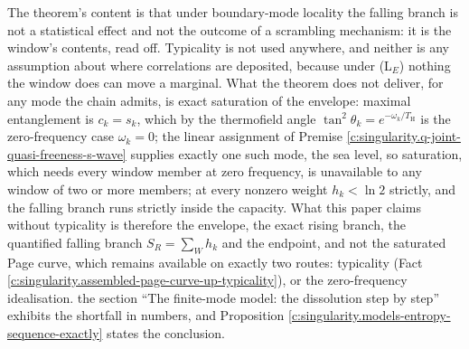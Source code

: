\documentclass[11pt]{article}
\theoremstyle{definition}
\theoremstyle{plain}
\providecommand{\TH}{}\renewcommand{\TH}{T_{\mathrm{H}}}
\begin{document}
\label{c:note.singularity.setting-eviction-theorem-falling-branch-without-3}
The theorem's content is that under boundary-mode locality the falling branch is not a statistical effect and not the outcome of a scrambling mechanism: it is the window's contents, read off. Typicality is not used anywhere, and neither is any assumption about where correlations are deposited, because under (L$_E$) nothing the window does can move a marginal. What the theorem does not deliver, for any mode the chain admits, is exact saturation of the envelope: maximal entanglement is $c_k = s_k$, which by the thermofield angle $\tan^{2}\theta_k = e^{-\omega_k/\TH}$ is the zero-frequency case $\omega_k = 0$; the linear assignment of Premise \ref{c:singularity.q-joint-quasi-freeness-s-wave} supplies exactly one such mode, the sea level, so saturation, which needs every window member at zero frequency, is unavailable to any window of two or more members; at every nonzero weight $h_k < \ln 2$ strictly, and the falling branch runs strictly inside the capacity. What this paper claims without typicality is therefore the envelope, the exact rising branch, the quantified falling branch $S_R = \sum_{W} h_k$ and the endpoint, and not the saturated Page curve, which remains available on exactly two routes: typicality (Fact \ref{c:singularity.assembled-page-curve-up-typicality}), or the zero-frequency idealisation. the section ``The finite-mode model: the dissolution step by step'' exhibits the shortfall in numbers, and Proposition \ref{c:singularity.models-entropy-sequence-exactly} states the conclusion.
\end{document}

